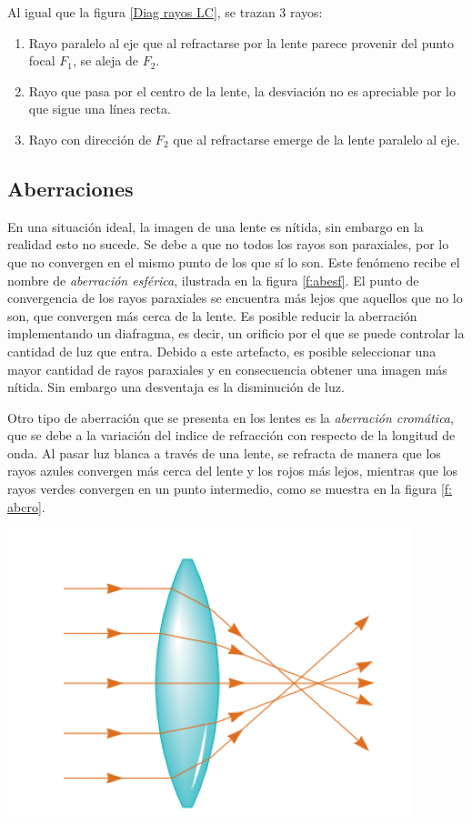\documentclass[a4paper,12pt]{article}
\newenvironment{Figure}
  {\par\medskip\noindent\minipage{\linewidth}}
  {\endminipage\par\medskip}
\begin{document}
\begin{multicols*}{2}
        Al igual que la figura \ref{Diag rayos LC}, se trazan 3 rayos:

        \begin{enumerate}
            \item Rayo paralelo al eje que al refractarse por la lente parece provenir del punto focal $F_{1}$, se aleja de $F_{2}$.
            \item Rayo que pasa por el centro de la lente, la desviación no es apreciable por lo que sigue una línea recta.
            \item Rayo con dirección de $F_{2}$ que al refractarse emerge de la lente paralelo al eje.
        \end{enumerate}

    \subsection*{Aberraciones}

        En una situación ideal, la imagen de una lente es nítida, sin embargo en la realidad esto no sucede. Se debe a que no todos los rayos son paraxiales, por lo que no convergen en el mismo punto de los que sí lo son. Este fenómeno recibe el nombre de \emph{aberración esférica}, ilustrada en la figura \ref{f:abesf}. El punto de convergencia de los rayos paraxiales se encuentra más lejos que aquellos que no lo son, que convergen más cerca de la lente. Es posible reducir la aberración implementando un diafragma, es decir, un orificio por el que se puede controlar la cantidad de luz que entra. Debido a este artefacto, es posible seleccionar una mayor cantidad de rayos paraxiales y en consecuencia obtener una imagen más nítida. Sin embargo una desventaja es la disminución de luz.

        Otro tipo de aberración que se presenta en los lentes es la \emph{aberración cromática}, que se debe a la variación del indice de refracción con respecto de la longitud de onda. Al pasar luz blanca a través de una lente, se refracta de manera que los rayos azules convergen más cerca del lente y los rojos más lejos, mientras que los rayos verdes convergen en un punto intermedio, como se muestra en la figura \ref{f: abcro}.

        \begin{Figure}
            \centering
            \includegraphics[width=0.7\linewidth]{Aberracion esfericaa.png}
            \label{f:abesf}
        \end{Figure}


\end{multicols*}
\end{document}
